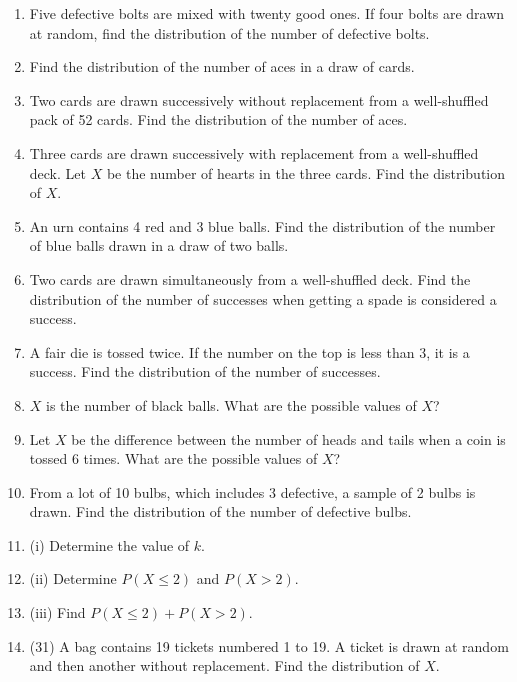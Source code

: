 \documentclass{article}
\begin{document}
\begin{enumerate}
    \item Five defective bolts are mixed with twenty good ones. If four bolts are drawn at random, find the distribution of the number of defective bolts.

    \item Find the distribution of the number of aces in a draw of cards.

    \item Two cards are drawn successively without replacement from a well-shuffled pack of 52 cards. Find the distribution of the number of aces.

    \item Three cards are drawn successively with replacement from a well-shuffled deck. Let \(X\) be the number of hearts in the three cards. Find the distribution of \(X\).

    \item An urn contains 4 red and 3 blue balls. Find the distribution of the number of blue balls drawn in a draw of two balls.

    \item Two cards are drawn simultaneously from a well-shuffled deck. Find the distribution of the number of successes when getting a spade is considered a success.

    \item A fair die is tossed twice. If the number on the top is less than 3, it is a success. Find the distribution of the number of successes.

    \item \(X\) is the number of black balls. What are the possible values of \(X\)?

    \item Let \(X\) be the difference between the number of heads and tails when a coin is tossed 6 times. What are the possible values of \(X\)?

    \item From a lot of 10 bulbs, which includes 3 defective, a sample of 2 bulbs is drawn. Find the distribution of the number of defective bulbs.

    \item (i) Determine the value of \(k\).

    \item (ii) Determine \(P(X \leq 2)\) and \(P(X > 2)\).

    \item (iii) Find \(P(X \leq 2) + P(X > 2)\).

    \item (31) A bag contains 19 tickets numbered 1 to 19. A ticket is drawn at random and then another without replacement. Find the distribution of \(X\).


\end{enumerate}
\end{document}
